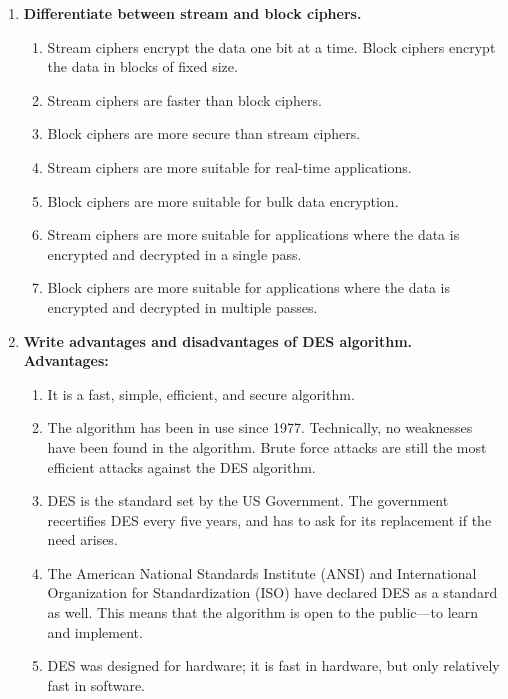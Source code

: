 \documentclass[11pt]{article}
\begin{document}
\begin{enumerate}
	\item \textbf{Differentiate between stream and block ciphers.}\\
	      \begin{enumerate}
		      \item Stream ciphers encrypt the data one bit at a time. Block ciphers encrypt the data in blocks of fixed size.
		      \item Stream ciphers are faster than block ciphers.
		      \item Block ciphers are more secure than stream ciphers.
		      \item Stream ciphers are more suitable for real-time applications.
		      \item Block ciphers are more suitable for bulk data encryption.
		      \item Stream ciphers are more suitable for applications where the data is encrypted and decrypted in a single pass.
		      \item Block ciphers are more suitable for applications where the data is encrypted and decrypted in multiple passes.
	      \end{enumerate}

	\item \textbf{Write advantages and disadvantages of DES algorithm.}\\

	      \textbf{Advantages:}
	      \begin{enumerate}
		      \item It is a fast, simple, efficient, and secure algorithm.
		      \item The algorithm has been in use since 1977. Technically, no weaknesses have been found in the algorithm. Brute force attacks are still the most efficient attacks against the DES algorithm.
		      \item DES is the standard set by the US Government. The government recertifies DES every five years, and has to ask for its replacement if the need arises.
		      \item The American National Standards Institute (ANSI) and International Organization for Standardization (ISO) have declared DES as a standard as well. This means that the algorithm is open to the public—to learn and implement.
		      \item DES was designed for hardware; it is fast in hardware, but only relatively fast in software.
	      \end{enumerate}


\end{enumerate}
\end{document}
